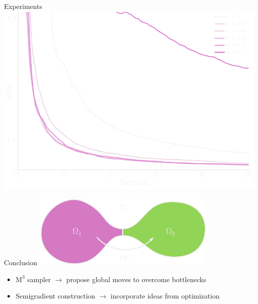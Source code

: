 \documentclass[mathserif]{beamer}
\begin{document}
\begin{frame}{Experiments}
\vspace{1em}
\centering
\includegraphics[width=\textwidth,trim=0 0 0 0,clip]{figures/exp3.pdf}
\end{frame}

\begin{frame}{Conclusion}
\centering
\includegraphics[width=3.5in]{figures/bottleneck_conclusion.pdf}

\vspace{2em}
\begin{itemize}
  \item $\mathrm{M}^3$ sampler $\rightarrow$ propose global moves to overcome bottlenecks
  \item Semigradient construction $\rightarrow$ incorporate ideas from optimization
\end{itemize}

\vspace{1em}

\end{frame}
\end{document}
